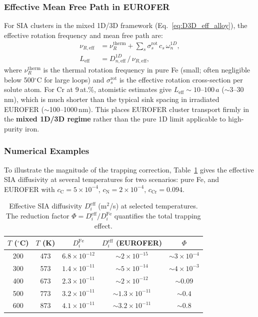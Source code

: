 \documentclass[pdflatex,sn-basic]{sn-jnl} %
\begin{document}
\subsubsection{Effective Mean Free Path in EUROFER}

For SIA clusters in the mixed 1D/3D framework (Eq.~\ref{eq:D3D_eff_alloy}),
the effective rotation frequency and mean free path are:
\begin{align}
    \nu_{R,\mathrm{eff}} &= \nu_R^{\mathrm{therm}} + \sum_s \sigma_s^{\mathrm{rot}}\,c_s\,\omega_n^{1D}, \label{eq:nuR_eff}\\
    L_{\mathrm{eff}} &= D_{n,\mathrm{eff}}^{1D}\,/\,\nu_{R,\mathrm{eff}}, \label{eq:Leff_eurofer}
\end{align}
where $\nu_R^{\mathrm{therm}}$ is the thermal rotation frequency in pure Fe
(small; often negligible below 500$^\circ$C for large loops) and
$\sigma_s^{\mathrm{rot}}$ is the effective rotation cross-section per solute
atom. For Cr at 9\,at.\%, atomistic estimates give
$L_{\mathrm{eff}} \sim 10$--$100\,a$ ($\sim$3--30\,nm), which is much shorter
than the typical sink spacing in irradiated EUROFER ($\sim$100--1000\,nm).
This places EUROFER cluster transport firmly in the \textbf{mixed 1D/3D regime}
rather than the pure 1D limit applicable to high-purity iron.

\subsubsection{Numerical Examples}

To illustrate the magnitude of the trapping correction,
Table~\ref{tab:D_numerical} gives the effective SIA diffusivity at several
temperatures for two scenarios: pure Fe, and EUROFER with
$c_{\mathrm{C}} = 5\times10^{-4}$, $c_{\mathrm{N}} = 2\times10^{-4}$,
$c_{\mathrm{Cr}} = 0.094$.

\begin{table}[htbp]
\centering
\caption{Effective SIA diffusivity $D_i^{\mathrm{eff}}$ (m$^2$/s) at selected
temperatures. The reduction factor
$\Phi = D_i^{\mathrm{eff}}/D_i^{\mathrm{Fe}}$ quantifies the total trapping
effect.}
\label{tab:D_numerical}
\begin{tabular}{ccccc}
\toprule
$T$ ($^\circ$C) & $T$ (K) & $D_i^{\mathrm{Fe}}$ & $D_i^{\mathrm{eff}}$ (EUROFER) & $\Phi$\\
\midrule
200 & 473 & $6.8\times10^{-12}$ & $\sim2\times10^{-15}$  & $\sim3\times10^{-4}$ \\
300 & 573 & $1.4\times10^{-11}$ & $\sim5\times10^{-14}$  & $\sim4\times10^{-3}$ \\
400 & 673 & $2.3\times10^{-11}$ & $\sim2\times10^{-12}$  & $\sim0.09$ \\
500 & 773 & $3.2\times10^{-11}$ & $\sim1.3\times10^{-11}$ & $\sim0.4$ \\
600 & 873 & $4.1\times10^{-11}$ & $\sim3.2\times10^{-11}$ & $\sim0.8$ \\
\bottomrule
\end{tabular}
\end{table}
\end{document}
